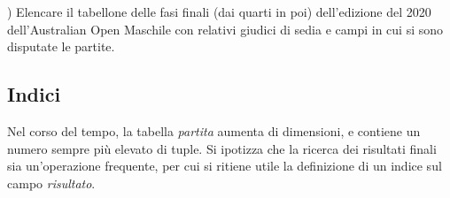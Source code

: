 \documentclass[10pt]{article}
\begin{document}
\begin{figure}[h]
\end{figure}
) Elencare il tabellone delle fasi finali (dai quarti in poi) dell'edizione del 2020 dell'Australian Open Maschile con relativi giudici di sedia e campi in cui si sono disputate le partite.

\begin{figure}[h]
\end{figure}

\subsection{Indici}
Nel corso del tempo, la tabella \textit{partita} aumenta di dimensioni, e contiene un numero sempre più elevato di tuple. Si ipotizza che la ricerca dei risultati finali sia un'operazione frequente, per cui si ritiene utile la definizione di un indice sul campo \textit{risultato}.
\begin{figure}[h]
\end{figure}
\end{document}
